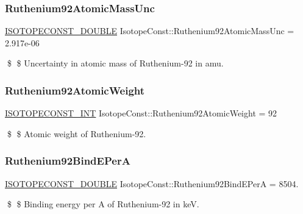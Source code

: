 \subsubsection{\texorpdfstring{Ruthenium92\+Atomic\+Mass\+Unc}{Ruthenium92AtomicMassUnc}}
{\footnotesize\ttfamily \mbox{\hyperlink{group___isotope_const-_macros_ga8f45a7272ce02c0b4c65c44636ed719a}{I\+S\+O\+T\+O\+P\+E\+C\+O\+N\+S\+T\+\_\+\+D\+O\+U\+B\+LE}} Isotope\+Const\+::\+Ruthenium92\+Atomic\+Mass\+Unc = 2.\+917e-\/06}

\$ \$ Uncertainty in atomic mass of Ruthenium-\/92 in amu. \mbox{\label{group___isotope_const-_ruthenium-_ru92_gaab24adf7e2af2a9990f2076307c4a239}} 
\subsubsection{\texorpdfstring{Ruthenium92\+Atomic\+Weight}{Ruthenium92AtomicWeight}}
{\footnotesize\ttfamily \mbox{\hyperlink{group___isotope_const-_macros_ga5f18360b3e99483a35c32d789e62621c}{I\+S\+O\+T\+O\+P\+E\+C\+O\+N\+S\+T\+\_\+\+I\+NT}} Isotope\+Const\+::\+Ruthenium92\+Atomic\+Weight = 92}

\$ \$ Atomic weight of Ruthenium-\/92. \mbox{\label{group___isotope_const-_ruthenium-_ru92_ga69d39742c193233da419abc9c4d13149}} 
\subsubsection{\texorpdfstring{Ruthenium92\+Bind\+E\+PerA}{Ruthenium92BindEPerA}}
{\footnotesize\ttfamily \mbox{\hyperlink{group___isotope_const-_macros_ga8f45a7272ce02c0b4c65c44636ed719a}{I\+S\+O\+T\+O\+P\+E\+C\+O\+N\+S\+T\+\_\+\+D\+O\+U\+B\+LE}} Isotope\+Const\+::\+Ruthenium92\+Bind\+E\+PerA = 8504.}

\$ \$ Binding energy per A of Ruthenium-\/92 in keV. \mbox{\label{group___isotope_const-_ruthenium-_ru92_gae8e32bdbb4d239a12b126c237d8169a6}} 
